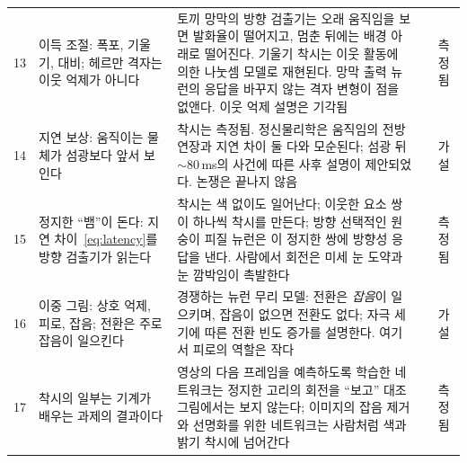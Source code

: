 {\begin{longtable}{>{\raggedright}p{0.5cm}>{\raggedright}p{4.0cm}>{\raggedright}p{5.6cm}>{\raggedright}p{2.3cm}>{\raggedright\arraybackslash}p{1.7cm}}
13 & 이득 조절: 폭포, 기울기, 대비; 헤르만 격자는 이웃 억제가 아니다 & 토끼 망막의 방향 검출기는 오래 움직임을 보면 발화율이 떨어지고, 멈춘 뒤에는 배경 아래로 떨어진다. 기울기 착시는 이웃 활동에 의한 나눗셈 모델로 재현된다. 망막 출력 뉴런의 응답을 바꾸지 않는 격자 변형이 점을 없앤다. 이웃 억제 설명은 기각됨 & \cite{BarlowHill1963,Schwartz2009,SchillerCarvey2005} & 측정됨 \\
14 & 지연 보상: 움직이는 물체가 섬광보다 앞서 보인다 & 착시는 측정됨. 정신물리학은 움직임의 전방 연장과 지연 차이 둘 다와 모순된다; 섬광 뒤 $\sim80$\,ms의 사건에 따른 사후 설명이 제안되었다. 논쟁은 끝나지 않음 & \cite{Nijhawan1994,EaglemanSejnowski2000} & 가설 \\
15 & 정지한 “뱀”이 돈다: 지연 차이~\eqref{eq:latency}를 방향 검출기가 읽는다 & 착시는 색 없이도 일어난다; 이웃한 요소 쌍이 하나씩 착시를 만든다; 방향 선택적인 원숭이 피질 뉴런은 이 정지한 쌍에 방향성 응답을 낸다. 사람에서 회전은 미세 눈 도약과 눈 깜박임이 촉발한다 & \cite{Conway2005,OteroMillan2012} & 측정됨 \\
16 & 이중 그림: 상호 억제, 피로, 잡음; 전환은 주로 잡음이 일으킨다 & 경쟁하는 뉴런 무리 모델: 전환은 \emph{잡음}이 일으키며, 잡음이 없으면 전환도 없다; 자극 세기에 따른 전환 빈도 증가를 설명한다. 여기서 피로의 역할은 작다 & \cite{MorenoBote2007} & 가설 \\
17 & 착시의 일부는 기계가 배우는 과제의 결과이다 & 영상의 다음 프레임을 예측하도록 학습한 네트워크는 정지한 고리의 회전을 “보고” 대조 그림에서는 보지 않는다; 이미지의 잡음 제거와 선명화를 위한 네트워크는 사람처럼 색과 밝기 착시에 넘어간다 & \cite{Watanabe2018,GomezVilla2020} & 측정됨 \\
\bottomrule
\end{longtable}}
